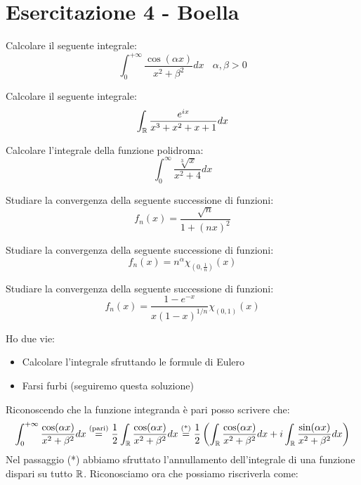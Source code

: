 \chapter{Esercitazione 4 - Boella}
\ParteEsercizi
\Esercizio{}

Calcolare il seguente integrale:
\begin{equation*}
\int ^{ + \infty }_{0}\frac{\cos (\alpha x)}{x^{2} + \beta ^{2}} dx\ \ \ \ \alpha ,\beta  > 0
\end{equation*}
\Esercizio{}

Calcolare il seguente integrale:
\begin{equation*}
\int _{\mathbb{R} }\frac{e^{ix}}{x^{3} + x^{2} + x + 1} dx
\end{equation*}
\Esercizio{}

Calcolare l'integrale della funzione polidroma:
\begin{equation*}
\int ^{\infty }_{0}\frac{\sqrt[3]{x}}{x^{2} + 4} dx
\end{equation*}
\Esercizio{}

Studiare la convergenza della seguente successione di funzioni:
\begin{equation*}
f_{n} (x) = \frac{\sqrt{n}}{1 + (nx)^{2}}
\end{equation*}
\Esercizio{}

Studiare la convergenza della seguente successione di funzioni:
\begin{equation*}
f_{n} (x) = n^{\alpha } \chi _{\left(0,\frac{1}{n}\right)} (x)
\end{equation*}
\Esercizio{}

Studiare la convergenza della seguente successione di funzioni:
\begin{equation*}
f_{n} (x) = \frac{1 - e^{ - x}}{x(1 - x)^{1/n}} \chi _{(0,1)} (x)
\end{equation*}
\ParteSoluzioni
\Soluzione

Ho due vie:
\begin{itemize}
\item Calcolare l'integrale sfruttando le formule di Eulero
\item Farsi furbi (seguiremo questa soluzione)
\end{itemize}

Riconoscendo che la funzione integranda è pari posso scrivere che:
\begin{equation*}
\int ^{ + \infty }_{0}\frac{\cos (\alpha x)}{x^{2} + \beta ^{2}} dx\overset{\text{(pari)}}{ = }\frac{1}{2}\int _{\mathbb{R} }\frac{\cos (\alpha x)}{x^{2} + \beta ^{2}} dx\overset{\text{(*)}}{ = }\frac{1}{2}\left(\int _{\mathbb{R} }\frac{\cos (\alpha x)}{x^{2} + \beta ^{2}} dx + i\int _{\mathbb{R} }\frac{\sin (\alpha x)}{x^{2} + \beta ^{2}} dx\right)
\end{equation*}
Nel passaggio (*) abbiamo sfruttato l'annullamento dell'integrale di una funzione dispari su tutto $\mathbb{R} $. Riconosciamo ora che possiamo riscriverla come:

